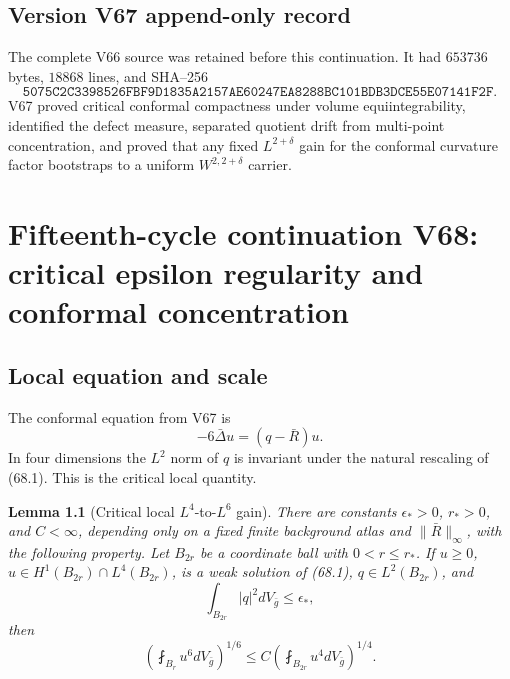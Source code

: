 \documentclass[11pt]{article}
\newtheorem{lemma}[theorem]{Lemma}
\theoremstyle{remark}
\begin{document}
\section*{Version V67 append-only record}
The complete V66 source was retained before this continuation.  It
had \(653736\) bytes, \(18868\) lines, and SHA--256
\[
 \texttt{5075C2C3398526FBF9D1835A2157AE60247EA8288BC101BDB3DCE55E07141F2F}.
\]
V67 proved critical conformal compactness under volume
equiintegrability, identified the defect measure, separated
quotient drift from multi-point concentration, and proved that any
fixed \(L^{2+\delta}\) gain for the conformal curvature factor
bootstraps to a uniform \(W^{2,2+\delta}\) carrier.

\chapter{Fifteenth-cycle continuation V68: critical epsilon regularity and conformal concentration}
\label{sec:v15v68}

\section{Local equation and scale}

The conformal equation from V67 is
\[
 -6\bar\Delta u=(q-\bar R)u.                           \tag{68.1}
\]
In four dimensions the \(L^2\) norm of \(q\) is invariant under
the natural rescaling of (68.1).  This is the critical local
quantity.

\begin{lemma}[Critical local \(L^4\)-to-\(L^6\) gain]
\label{lem:v15v68-local-gain}
There are constants \(\epsilon_*>0\), \(r_*>0\), and \(C<\infty\),
depending only on a fixed finite background atlas and
\(\|\bar R\|_\infty\), with the following property.  Let
\(B_{2r}\) be a coordinate ball with \(0<r\leq r_*\).  If
\(u\geq0\), \(u\in H^1(B_{2r})\cap L^4(B_{2r})\), is a weak
solution of (68.1), \(q\in L^2(B_{2r})\), and
\[
 \int_{B_{2r}}|q|^2dV_{\bar g}\leq\epsilon_*,          \tag{68.2}
\]
then
\[
 \left(\fint_{B_r}u^6dV_{\bar g}\right)^{1/6}
 \leq
 C\left(\fint_{B_{2r}}u^4dV_{\bar g}\right)^{1/4}.
                                                               \tag{68.3}
\]
\end{lemma}
\end{document}
